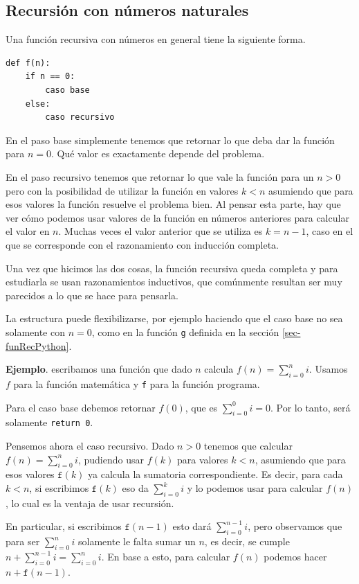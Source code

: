 \documentclass[a4paper, 12pt]{report}
\theoremstyle{definition}
\begin{document}
\subsection{Recursión con números naturales}

Una función recursiva con números en general tiene la siguiente forma.
\begin{verbatim}
def f(n):
    if n == 0:
        caso base
    else:
        caso recursivo
\end{verbatim}

En el paso base simplemente tenemos que retornar lo que deba dar la función para $n=0$. Qué valor es exactamente depende del problema.

En el paso recursivo tenemos que retornar lo que vale la función para un $n>0$ pero con la posibilidad de utilizar la función en valores $k<n$ asumiendo que para esos valores la función resuelve el problema bien. Al pensar esta parte, hay que ver cómo podemos usar valores de la función en números anteriores para calcular el valor en $n$. Muchas veces el valor anterior que se utiliza es $k=n-1$, caso en el que se corresponde con el razonamiento con inducción completa.

Una vez que hicimos las dos cosas, la función recursiva queda completa y para estudiarla se usan razonamientos inductivos, que comúnmente resultan ser muy parecidos a lo que se hace para pensarla.

La estructura puede flexibilizarse, por ejemplo haciendo que el caso base no sea solamente con $n=0$, como en la función {\tt g} definida en la sección \ref{sec-funRecPython}.

\vspace{0.5em}
{\bf Ejemplo}. escribamos una función que dado $n$ calcula $f(n)=\sum_{i=0}^ni$. Usamos $f$ para la función matemática y {\tt f} para la función programa.

Para el caso base debemos retornar $f(0)$, que es $\sum_{i=0}^0i=0$. Por lo tanto, será solamente {\tt return 0}.

Pensemos ahora el caso recursivo. Dado $n>0$ tenemos que calcular $f(n)=\sum_{i=0}^ni$, pudiendo usar $f(k)$ para valores $k<n$, asumiendo que para esos valores $\mathtt{f}(k)$ ya calcula la sumatoria correspondiente. Es decir, para cada $k<n$, si escribimos $\mathtt{f}(k)$ eso da $\sum_{i=0}^ki$ y lo podemos usar para calcular $f(n)$, lo cual es la ventaja de usar recursión.

En particular, si escribimos $\mathtt{f}(n-1)$ esto dará $\sum_{i=0}^{n-1}i$, pero observamos que para ser $\sum_{i=0}^{n}i$ solamente le falta sumar un $n$, es decir,  se cumple $n+\sum_{i=0}^{n-1}i=\sum_{i=0}^{n}i$. En base a esto, para calcular $f(n)$ podemos hacer $n + \mathtt{f}(n-1)$.
\end{document}

